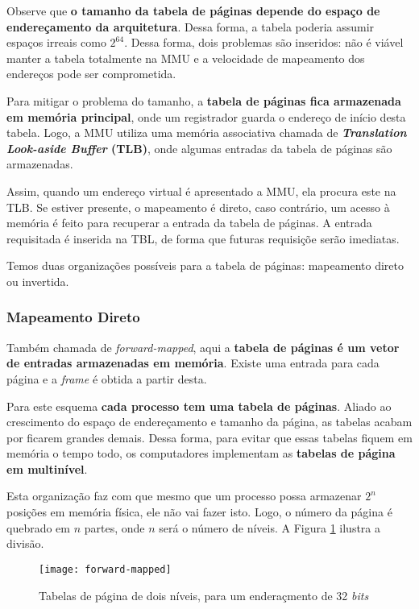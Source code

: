Observe que \textbf{o tamanho da tabela de páginas depende do espaço de endereçamento da arquitetura}. Dessa forma, a tabela poderia assumir espaços irreais como $2^{64}$. Dessa forma, dois problemas são inseridos: não é viável manter a tabela totalmente na MMU e a velocidade de mapeamento dos endereços pode ser comprometida.

Para mitigar o problema do tamanho, a \textbf{tabela de páginas fica armazenada em memória principal}, onde um registrador guarda o endereço de início desta tabela. Logo, a MMU utiliza uma memória associativa chamada de \textbf{\textit{Translation Look-aside Buffer} (TLB)}, onde algumas entradas da tabela de páginas são armazenadas.

Assim, quando um endereço virtual é apresentado a MMU, ela procura este na TLB. Se estiver presente, o mapeamento é direto, caso contrário, um acesso à memória é feito para recuperar a entrada da tabela de páginas. A entrada requisitada é inserida na TBL, de forma que futuras requisiçõe serão imediatas.

Temos duas organizações possíveis para a tabela de páginas: mapeamento direto ou invertida.

\subsubsection{Mapeamento Direto}
Também chamada de \textit{forward-mapped}, aqui a \textbf{tabela de páginas é um vetor de entradas armazenadas em memória}. Existe uma entrada para cada página e a \textit{frame} é obtida a partir desta.

Para este esquema \textbf{cada processo tem uma tabela de páginas}. Aliado ao crescimento do espaço de endereçamento e tamanho da página, as tabelas acabam por ficarem grandes demais. Dessa forma, para evitar que essas tabelas fiquem em memória o tempo todo, os computadores implementam as \textbf{tabelas de página em  multinível}.

Esta organização faz com que mesmo que um processo possa armazenar $2^n$ posições em memória física, ele não vai fazer isto. Logo, o número da página é quebrado em $n$ partes, onde $n$ será o número de níveis. A Figura \ref{fig:forward-mapped} ilustra a divisão.

\begin{figure}[h]
  \centering
  \texttt{[image: forward-mapped]}
  \caption{Tabelas de página de dois níveis, para um enderaçmento de 32 \textit{bits}}
  \label{fig:forward-mapped}
\end{figure}

